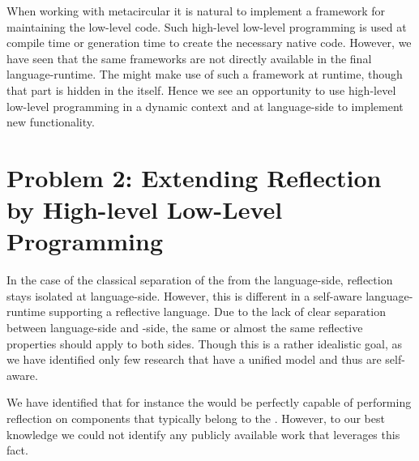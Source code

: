 When working with metacircular \VMs it is natural to implement a framework for maintaining the low-level code.
Such high-level low-level programming \cite{Fram09a} is used at compile time or \VM generation time to create the necessary native code.
However, we have seen that the same frameworks are not directly available in the final language-runtime.
The \JIT might make use of such a framework at runtime, though that part is hidden in the \VM itself.
Hence we see an opportunity to use high-level low-level programming in a dynamic context and at language-side to implement new functionality.


\section{Problem 2: Extending Reflection by High-level Low-Level Programming}
In the case of the classical separation of the \VM from the language-side, reflection stays isolated at language-side.
However, this is different in a self-aware language-runtime supporting a reflective language.
Due to the lack of clear separation between language-side and \VM-side, the same or almost the same reflective properties should apply to both sides.
Though this is a rather idealistic goal, as we have identified only few research \VMs that have a unified model and thus are self-aware.

We have identified that for instance the \Klein \VM would be perfectly capable of performing reflection on components that typically belong to the \VM.
However, to our best knowledge we could not identify any publicly available work that leverages this fact.


